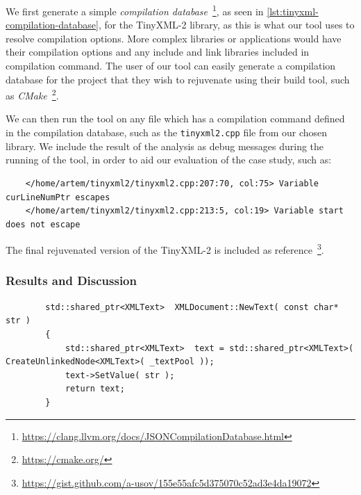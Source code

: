 \documentclass{mpaper}
\begin{document}
    \begin{listing}
        \inputminted{json}{code/compile_commands.json}
        \caption{Compilation Database for TinyXML-2}
        \label{lst:tinyxml-compilation-database}
    \end{listing}
    
    We first generate a simple \emph{compilation database}~\footnote{\url{https://clang.llvm.org/docs/JSONCompilationDatabase.html}}, as seen in \autoref{lst:tinyxml-compilation-database}, for the TinyXML-2 library, as this is what our tool uses to resolve compilation options. 
    More complex libraries or applications would have their compilation options and any include and link libraries included in compilation command.
    The user of our tool can easily generate a compilation database for the project that they wish to rejuvenate using their build tool, such as \emph{CMake}~\footnote{\url{https://cmake.org/}}.
    
    We can then run the tool on any file which has a compilation command defined in the compilation database, such as the \texttt{tinyxml2.cpp} file from our chosen library.   
    We include the result of the analysis as debug messages during the running of the tool, in order to aid our evaluation of the case study, such as:
    \begin{verbatim}
    </home/artem/tinyxml2/tinyxml2.cpp:207:70, col:75> Variable curLineNumPtr escapes
    </home/artem/tinyxml2/tinyxml2.cpp:213:5, col:19> Variable start does not escape
    \end{verbatim}
    
    The final rejuvenated version of the TinyXML-2 is included as reference~\footnote{\url{https://gist.github.com/a-usov/155e55afc5d375070c52ad3e4da19072}}.
    
    \subsubsection{Results and Discussion}
    
    \begin{listing}
        \centering
        \begin{verbatim}
        std::shared_ptr<XMLText>  XMLDocument::NewText( const char* str )
        {
            std::shared_ptr<XMLText>  text = std::shared_ptr<XMLText>( CreateUnlinkedNode<XMLText>( _textPool ));
            text->SetValue( str );
            return text;
        }
        \end{verbatim}
        \caption{Rejuvenated version of the method in \autoref{lst:tinyxml-refactor-example}. The \texttt{text} variable has been identified as being eligible to be a \texttt{shared\_ptr}. The first, second and fourth of our rewriting rules are applied in this example to the \texttt{text} variable.}
        \label{lst:tinyxml-refactor-example-refactored}
    \end{listing}
    
\end{document}
